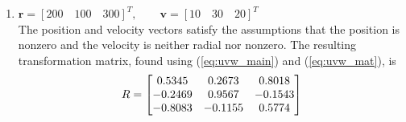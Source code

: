 \documentclass[11pt,fleqn]{report}
\begin{document}
\begin{enumerate}
\item $\textbf{r} = [200 \quad 100 \quad 300]^T, \qquad
 \textbf{v} = [10 \quad 30 \quad 20]^T$ \\
 The position and velocity vectors satisfy the assumptions that the
 position is nonzero and the velocity is neither radial nor nonzero.
 The resulting transformation matrix, found using
 (\ref{eq:uvw_main}) and (\ref{eq:uvw_mat}), is
 \begin{equation*}
\hfill R = \begin{bmatrix} 0.5345 & 0.2673 & 0.8018 \\
-0.2469 & 0.9567 & -0.1543 \\
-0.8083 & -0.1155 & 0.5774
 \end{bmatrix} \hfill
 \end{equation*}
\end{enumerate}
\end{document}
